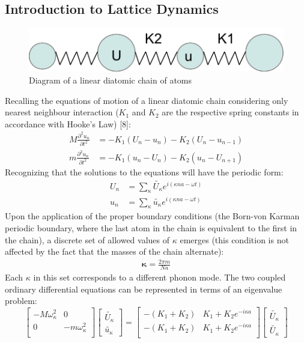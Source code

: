 \documentclass{article}
\numberwithin{equation}{section}
\begin{document}
\subsection{Introduction to Lattice Dynamics}
\begin{figure}[ht]
\centering
\includegraphics[scale=0.5]{diatomic.png}
\caption{Diagram of a linear diatomic chain of atoms}
\end{figure}
Recalling the equations of motion of a linear diatomic chain considering only nearest neighbour interaction ($K_1$ and $K_2$ are the respective spring constants in accordance with Hooke's Law) [8]:
\begin{align*}
	M\frac{\partial ^2 u_n}{\partial t^2}&=-K_1(U_n-u_n)-K_2(U_n-u_{n-1})\\
	m\frac{\partial ^2 u_n}{\partial t^2}&=-K_1(u_n-U_n)-K_2(u_n-U_{n+1})
\end{align*}
Recognizing that the solutions to the equations will have the periodic form:
\begin{align*}
	U_n&=\sum_\kappa \tilde{U_\kappa}e^{i(\kappa na-\omega t)}\\
	u_n&=\sum_\kappa \tilde{u_\kappa}e^{i(\kappa na-\omega t)}
\end{align*}
Upon the application of the proper boundary conditions (the Born-von Karman periodic boundary, where the last atom in the chain is equivalent to the first in the chain), a discrete set of allowed values of $\kappa$ emerges (this condition is not affected by the fact that the masses of the chain alternate):
\begin{align*}
	\pmb{\kappa}=\frac{2\pi m}{Na}
\end{align*}
Each $\kappa$ in this set corresponds to a different phonon mode. The two coupled ordinary differential equations can be represented in terms of an eigenvalue problem:
\[
\begin{bmatrix}
  -M\omega_\kappa^2 & 0\\
  0 & -m\omega_\kappa^2\\ 
 \end{bmatrix}
\begin{bmatrix}
\tilde{U_\kappa} \\ 
\tilde{u_\kappa}
\end{bmatrix}
=
\begin{bmatrix}
  -(K_1+K_2) & K_1+K_2e^{-i\kappa a}\\
  -(K_1+K_2) & K_1+K_2e^{-i\kappa a}\\ 
 \end{bmatrix}
\begin{bmatrix}
\tilde{U_\kappa} \\ \tilde{U_\kappa}
\end{bmatrix}
\]
\end{document}
